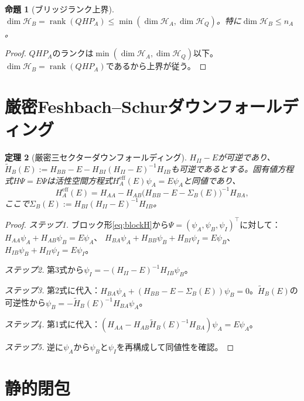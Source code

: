 \documentclass[12pt]{article}
\theoremstyle{plain}
\newtheorem{theorem}{定理}[section]
\newtheorem{proposition}[theorem]{命題}
\theoremstyle{definition}
\numberwithin{equation}{section}
\newcommand{\eff}{\mathrm{eff}}
\DeclareMathOperator{\rank}{rank}
\begin{document}
\begin{proposition}[ブリッジランク上界]\label{prop:rankbound}
$\dim\mathcal{H}_B=\rank(QHP_A)\leq\min(\dim\mathcal{H}_A,\dim\mathcal{H}_Q)$。特に$\dim\mathcal{H}_B\leq n_A$。
\end{proposition}

\begin{proof}
$QHP_A$のランクは$\min(\dim\mathcal{H}_A,\dim\mathcal{H}_Q)$以下。$\dim\mathcal{H}_B=\rank(QHP_A)$であるから上界が従う。
\end{proof}


\section{厳密Feshbach--Schurダウンフォールディング}\label{sec:feshbach}

\begin{theorem}[厳密三セクターダウンフォールディング]\label{thm:downfolding}
$H_{II}-E$が可逆であり、$\widetilde{H}_B(E):=H_{BB}-E-H_{BI}(H_{II}-E)^{-1}H_{IB}$も可逆であるとする。固有値方程式$H\Psi=E\Psi$は活性空間方程式$H_A^{\eff}(E)\psi_A=E\psi_A$と同値であり、
\begin{equation}\label{eq:Heff}
\boxed{H_A^{\eff}(E) = H_{AA} - H_{AB}\bigl(H_{BB}-E-\Sigma_B(E)\bigr)^{-1}H_{BA},}
\end{equation}
ここで$\Sigma_B(E):=H_{BI}(H_{II}-E)^{-1}H_{IB}$。
\end{theorem}

\begin{proof}
\emph{ステップ1.} ブロック形\eqref{eq:blockH}から$\Psi=(\psi_A,\psi_B,\psi_I)^\top$に対して：
$H_{AA}\psi_A+H_{AB}\psi_B=E\psi_A$、
$H_{BA}\psi_A+H_{BB}\psi_B+H_{BI}\psi_I=E\psi_B$、
$H_{IB}\psi_B+H_{II}\psi_I=E\psi_I$。

\emph{ステップ2.} 第3式から$\psi_I=-(H_{II}-E)^{-1}H_{IB}\psi_B$。

\emph{ステップ3.} 第2式に代入：$H_{BA}\psi_A+(H_{BB}-E-\Sigma_B(E))\psi_B=0$。$\widetilde{H}_B(E)$の可逆性から$\psi_B=-\widetilde{H}_B(E)^{-1}H_{BA}\psi_A$。

\emph{ステップ4.} 第1式に代入：$(H_{AA}-H_{AB}\widetilde{H}_B(E)^{-1}H_{BA})\psi_A=E\psi_A$。

\emph{ステップ5.} 逆に$\psi_A$から$\psi_B$と$\psi_I$を再構成して同値性を確認。
\end{proof}


\section{静的閉包}\label{sec:static}
\end{document}
